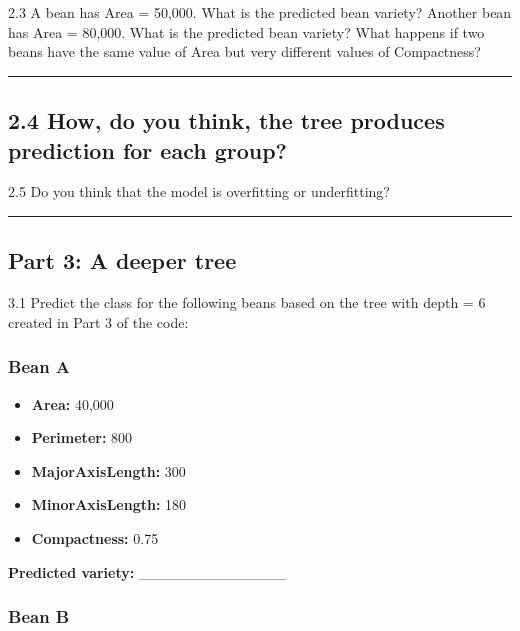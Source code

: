\documentclass[
  a4paper,
  DIV=11,
  numbers=noendperiod]{scrartcl}
\providecommand{\tightlist}{%
  \setlength{\itemsep}{0pt}\setlength{\parskip}{0pt}}
\begin{document}
2.3 A bean has Area = 50,000. What is the predicted bean variety?
Another bean has Area = 80,000. What is the predicted bean variety? What
happens if two beans have the same value of Area but very different
values of Compactness?

\begin{center}\rule{0.5\linewidth}{0.5pt}\end{center}

\subsection{2.4 How, do you think, the tree produces prediction for each
group?}\label{how-do-you-think-the-tree-produces-prediction-for-each-group}

2.5 Do you think that the model is overfitting or underfitting?

\begin{center}\rule{0.5\linewidth}{0.5pt}\end{center}

\subsection{Part 3: A deeper tree}\label{part-3-a-deeper-tree}

3.1 Predict the class for the following beans based on the tree with
depth = 6 created in Part 3 of the code:

\subsubsection{Bean A}\label{bean-a}

\begin{itemize}
\tightlist
\item
  \textbf{Area:} 40,000
\item
  \textbf{Perimeter:} 800
\item
  \textbf{MajorAxisLength:} 300
\item
  \textbf{MinorAxisLength:} 180
\item
  \textbf{Compactness:} 0.75
\end{itemize}

\textbf{Predicted variety:} \_\_\_\_\_\_\_\_\_\_\_\_\_\_

\subsubsection{Bean B}\label{bean-b}
\end{document}
